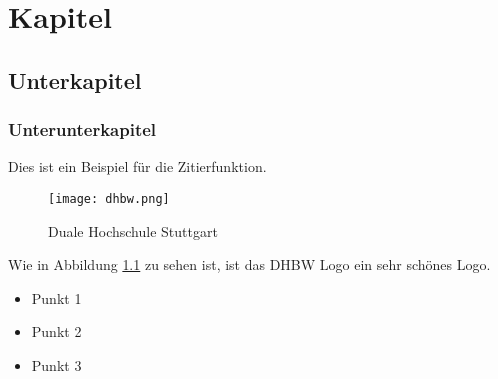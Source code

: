 \chapter{Kapitel}
   
\section{Unterkapitel}

\subsection{Unterunterkapitel}

Dies ist ein Beispiel für die Zitierfunktion. \cite[Vgl.][S. 1 ff.]{.Mustermann2023} 



\newpage

\begin{figure}[h]
    \centering
    \texttt{[image: dhbw.png]}
    \caption{Duale Hochschule Stuttgart \cite{.Mustermann2023}}
    \label{fig:DHBW_Logo}
\end{figure}


Wie in Abbildung \ref{fig:DHBW_Logo} zu sehen ist, ist das \acs{DHBW} Logo ein sehr schönes Logo.


\begin{itemize}[label=\textbullet]
    \item Punkt 1
    \item Punkt 2
    \item Punkt 3
\end{itemize}